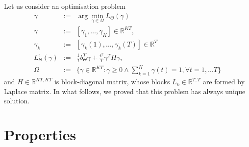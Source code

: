 \documentclass{article}
\begin{document}
Let us consider an optimisation problem
\begin{displaymath}
\begin{array}{rcl}
 \bar{\gamma} & := & \arg \min\limits_{\gamma \in \Omega} L_{\Theta}(\gamma) \\
 \gamma & := & [\gamma_1, \dots, \gamma_K] \in \mathbb{R}^{KT}, \\
 \gamma_k & := & [\gamma_k(1), \dots, \gamma_k(T)] \in \mathbb{R}^{T} \\
 L^{\epsilon}_{\Theta}(\gamma) & := & \frac{1}{T} b_{\Theta}^T \gamma + \frac{\epsilon^2}{T} \gamma^T H \gamma, \\
 \Omega & := & \lbrace \gamma \in \mathbb{R}^{KT}: \gamma \geq 0 \wedge \sum\limits_{k=1}^K \gamma(t) = 1, \forall t = 1,\dots T \rbrace
\end{array}
\end{displaymath}
and $H \in \mathbb{R}^{KT,KT}$ is block-diagonal matrix, whose blocks $L_k \in \mathbb{R}^{T,T}$ are formed by Laplace matrix. \newline
In what follows, we proved that this problem has always unique solution.

\section{Properties}
\end{document}
